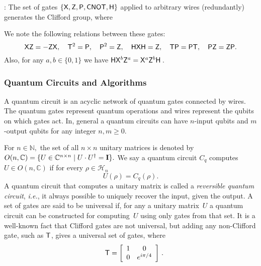 \begin{definition}
\label{defn:Clifford+T:family}
 : The set of gates $\{{\sf X}, {\sf Z}, {\sf P}, {\sf CNOT},{\sf H}\}$ applied to arbitrary wires (redundantly) generates the Clifford group, where


We note the following relations between these gates:
$${\sf X}{\sf Z} = - {\sf Z}{\sf X},\quad {\sf T}^2={\sf P},\quad{\sf P}^2={\sf Z},\quad{\sf H}{\sf X}{\sf H}={\sf Z},\quad {\sf T}{\sf P}={\sf P}{\sf T},\quad{\sf P}{\sf Z}={\sf Z}{\sf P}.$$
Also, for any $a,b\in\{0,1\}$ we have
${\sf H}{\sf X}^b{\sf Z}^a={\sf X}^a{\sf Z}^b {\sf H}$\,.
\end{definition}

\subsubsection{Quantum Circuits and Algorithms}
A quantum circuit is an acyclic network of quantum gates connected by wires. The quantum gates represent quantum operations and wires represent the qubits on which gates act. In, general a quantum circuits can have $n$-input qubits and $m$-output qubits for any integer $n,m\geq 0.$

For $n\in \mathbb{N},$ the set of all $n\times n$ unitary matrices is denoted by $O(n,\mathbb{C})=\{U\in \mathbb{C}^{n\times n} \mid U\cdot U^\dagger={\bf I}\}.$ We say a quantum circuit $C_q$ computes $U\in O(n,\mathbb{C})$ if for every $\rho\in \mathcal{H}_n$
$$U(\rho )=C_q(\rho).$$ 
A quantum circuit that computes a unitary matrix is called a \emph{reversible  quantum circuit}, \emph{i.e.}, it always possible to uniquely recover the input, given the output. A set of gates are said to be universal if, for any a unitary matrix~$U$  a quantum circuit can be constructed for computing~$U$ using only gates from that set. It is a well-known fact that Clifford gates are not universal, but adding any non-Clifford gate, such as ${\sf T}$, gives a universal set of gates, where
$$\quad{\sf T} = \left[\begin{array}{cc} 1 & 0\\ 0 & e^{i\pi/4}\end{array}\right]\,.$$ 

